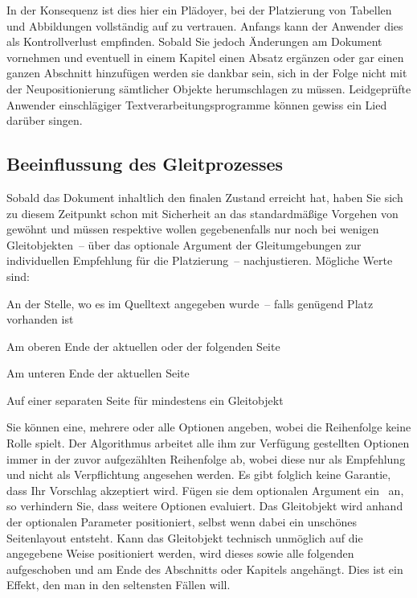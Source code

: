 \documentclass[%
  english,ngerman,%
  geometry=no,DIV=12,automark,%
]{tudscrartcl}
\begin{document}
\InputCode\noindent
%
In der Konsequenz ist dies hier ein Plädoyer, bei der Platzierung von Tabellen 
und Abbildungen vollständig auf  zu vertrauen. Anfangs kann der 
Anwender dies als Kontrollverlust empfinden. Sobald Sie jedoch Änderungen am 
Dokument vornehmen und eventuell in einem Kapitel einen Absatz ergänzen oder 
gar einen ganzen Abschnitt hinzufügen werden sie dankbar sein, sich in der 
Folge nicht mit der Neupositionierung sämtlicher Objekte herumschlagen zu 
müssen. Leidgeprüfte Anwender einschlägiger Textverarbeitungsprogramme können 
gewiss ein Lied darüber singen.



\subsection{Beeinflussung des Gleitprozesses}
Sobald das Dokument inhaltlich den finalen Zustand erreicht hat, haben Sie sich 
zu diesem Zeitpunkt schon mit Sicherheit an das standardmäßige Vorgehen von 
 gewöhnt und müssen respektive wollen gegebenenfalls nur noch bei 
wenigen Gleitobjekten~-- über das optionale Argument der Gleitumgebungen zur
individuellen Empfehlung für die Platzierung~-- nachjustieren. Mögliche Werte 
sind:
%
\begin{description}[labelindent=\parindent,leftmargin=*,style=nextline]
\item[\POParameter{h} (here)]
  An der Stelle, wo es im Quelltext angegeben wurde~-- falls genügend Platz 
  vorhanden ist
\item[\POParameter{t} (top)]
  Am oberen Ende der aktuellen oder der folgenden Seite
\item[\POParameter{b} (bottom)]
  Am unteren Ende der aktuellen Seite
\item[\POParameter{p} (page)]
  Auf einer separaten Seite für mindestens ein Gleitobjekt
\end{description}
%
Sie können eine, mehrere oder alle Optionen angeben, wobei die Reihenfolge 
keine Rolle spielt. Der Algorithmus arbeitet alle ihm zur Verfügung gestellten 
Optionen immer in der zuvor aufgezählten Reihenfolge ab, wobei diese nur als 
Empfehlung und nicht als Verpflichtung angesehen werden. Es gibt folglich keine 
Garantie, dass Ihr Vorschlag akzeptiert wird. Fügen sie dem optionalen Argument 
ein~\PValue{!} an, so verhindern Sie, dass  weitere Optionen 
evaluiert. Das Gleitobjekt wird anhand der optionalen Parameter positioniert, 
selbst wenn dabei ein unschönes Seitenlayout entsteht. Kann das Gleitobjekt 
technisch unmöglich auf die angegebene Weise positioniert werden, wird dieses 
sowie alle folgenden aufgeschoben und am Ende des Abschnitts oder Kapitels 
angehängt. Dies ist ein Effekt, den man in den seltensten Fällen will. 
\end{document}
